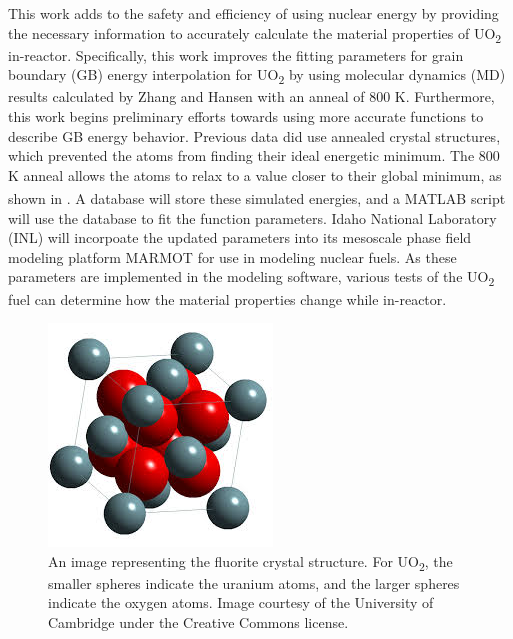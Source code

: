 \documentclass[twoside,senior]{BYUPhys}
\begin{document}
This work adds to the safety and efficiency of using nuclear energy by providing the necessary information to accurately calculate the material properties of UO\textsubscript{2} in-reactor.  Specifically, this work improves the fitting parameters for grain boundary (GB) energy interpolation for UO\textsubscript{2} by using molecular dynamics (MD) results calculated by Zhang\cite{zhang2016} and Hansen\cite{hansen2016} with an anneal of 800 K.  Furthermore, this work begins preliminary efforts towards using more accurate functions to describe GB energy behavior.  Previous data did use annealed crystal structures\cite{harbison2015}, which prevented the atoms from finding their ideal energetic minimum.  The 800 K anneal allows the atoms to relax to a value closer to their global minimum, as shown in .  A database will store these simulated energies, and a MATLAB\textsuperscript{\textregistered} script will use the database to fit the function parameters.  Idaho National Laboratory (INL) will incorpoate the updated parameters into its mesoscale phase field modeling platform MARMOT for use in modeling nuclear fuels.  As these parameters are implemented in the modeling software, various tests of the UO\textsubscript{2} fuel can determine how the material properties change while in-reactor.

\begin{figure}[ht!]
\centering
\includegraphics[scale=1.0]{Images/UO2}
\caption[Example of the fluorite crystal structure.]{\label{fig:uo2Lattice}An image representing the fluorite crystal structure.  For UO\textsubscript{2}, the smaller spheres indicate the uranium atoms, and the larger spheres indicate the oxygen atoms.  Image courtesy of the University of Cambridge under the Creative Commons license.}
\end{figure}
\end{document}
